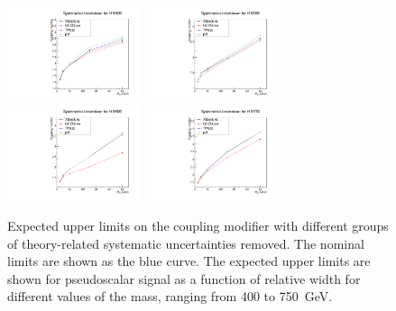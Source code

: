 \begin{figure}[!Hhtb]
\centering
\includegraphics[width=0.35\textwidth,keepaspectratio=true]{fig/app5/breakdowns/theory_breakdown_H_M400.pdf}
\includegraphics[width=0.35\textwidth,keepaspectratio=true]{fig/app5/breakdowns/theory_breakdown_H_M500.pdf}
\includegraphics[width=0.35\textwidth,keepaspectratio=true]{fig/app5/breakdowns/theory_breakdown_H_M600.pdf}
\includegraphics[width=0.35\textwidth,keepaspectratio=true]{fig/app5/breakdowns/theory_breakdown_H_M750.pdf}
\caption{Expected upper limits on the coupling modifier with different groups of theory-related systematic uncertainties removed. The nominal limits are shown as the blue curve. The expected upper limits are shown for pseudoscalar signal as a function of relative width for different values of the mass, ranging from 400 to 750~GeV.}
\label{fig:theory_breakdown_hmass}
\end{figure}

